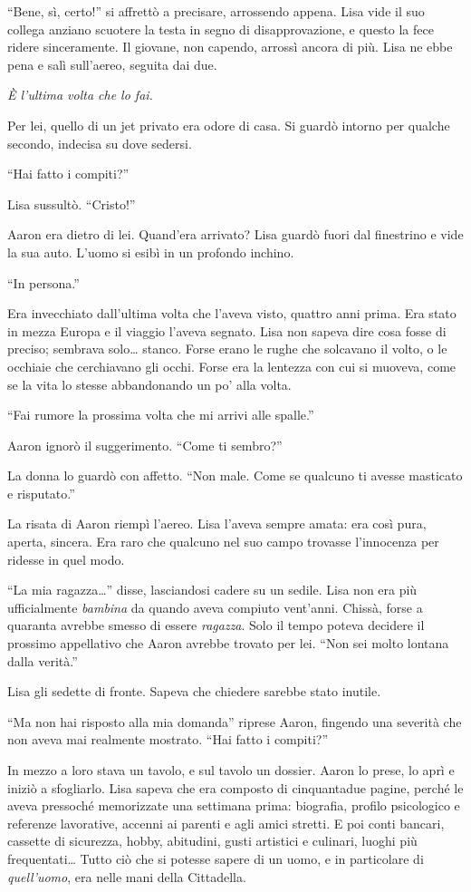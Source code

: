 \documentclass[a4paper,oneside,11pt]{memoir}
\begin{document}
``Bene, sì, certo!'' si affrettò a precisare, arrossendo appena. Lisa vide il
suo collega anziano scuotere la testa in segno di disapprovazione, e questo la
fece ridere sinceramente. Il giovane, non capendo, arrossì ancora di più. Lisa
ne ebbe pena e salì sull'aereo, seguita dai due.

\emph{È l'ultima volta che lo fai.}

Per lei, quello di un jet privato era odore di casa. Si guardò intorno per
qualche secondo, indecisa su dove sedersi.

``Hai fatto i compiti?''

Lisa sussultò. ``Cristo!''

Aaron era dietro di lei. Quand'era arrivato? Lisa guardò fuori dal finestrino e
vide la sua auto. L'uomo si esibì in un profondo inchino.

``In persona.''

Era invecchiato dall'ultima volta che l'aveva visto, quattro anni prima. Era
stato in mezza Europa e il viaggio l'aveva segnato. Lisa non sapeva dire cosa
fosse di preciso; sembrava solo\dots{} stanco. Forse erano le rughe che
solcavano il volto, o le occhiaie che cerchiavano gli occhi. Forse era la
lentezza con cui si muoveva, come se la vita lo stesse abbandonando un po' alla
volta.

``Fai rumore la prossima volta che mi arrivi alle spalle.''

Aaron ignorò il suggerimento. ``Come ti sembro?''

La donna lo guardò con affetto. ``Non male. Come se qualcuno ti avesse masticato
e risputato.''

La risata di Aaron riempì l'aereo. Lisa l'aveva sempre amata: era così pura,
aperta, sincera. Era raro che qualcuno nel suo campo trovasse l'innocenza per
ridesse in quel modo.

``La mia ragazza\dots{}'' disse, lasciandosi cadere su un sedile. Lisa non era
più ufficialmente \emph{bambina} da quando aveva compiuto vent'anni. Chissà,
forse a quaranta avrebbe smesso di essere \emph{ragazza}. Solo il tempo poteva
decidere il prossimo appellativo che Aaron avrebbe trovato per lei. ``Non sei
molto lontana dalla verità.''

Lisa gli sedette di fronte. Sapeva che chiedere sarebbe stato inutile.

``Ma non hai risposto alla mia domanda'' riprese Aaron, fingendo una severità
che non aveva mai realmente mostrato. ``Hai fatto i compiti?''

In mezzo a loro stava un tavolo, e sul tavolo un dossier. Aaron lo prese, lo
aprì e iniziò a sfogliarlo. Lisa sapeva che era composto di cinquantadue pagine,
perché le aveva pressoché memorizzate una settimana prima: biografia, profilo
psicologico e referenze lavorative, accenni ai parenti e agli amici stretti. E
poi conti bancari, cassette di sicurezza, hobby, abitudini, gusti artistici e
culinari, luoghi più frequentati\dots{} Tutto ciò che si potesse sapere di un
uomo, e in particolare di \emph{quell'uomo}, era nelle mani della Cittadella.
\end{document}
